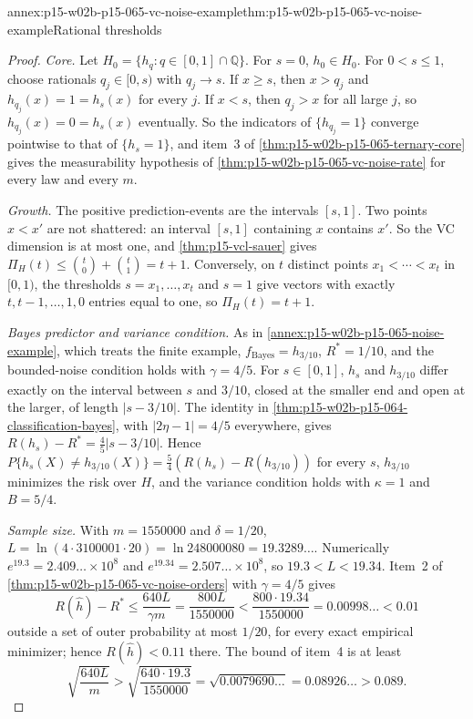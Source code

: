 \begin{annexitem}{annex:p15-w02b-p15-065-vc-noise-example}{thm:p15-w02b-p15-065-vc-noise-example}{Rational thresholds}
\begin{proof}
\emph{Core.} Let \(H_0=\{h_q:q\in[0,1]\cap\mathbb Q\}\). For \(s=0\),
\(h_0\in H_0\). For \(0<s\leq1\), choose rationals \(q_j\in[0,s)\) with
\(q_j\to s\). If \(x\geq s\), then \(x>q_j\) and \(h_{q_j}(x)=1=h_s(x)\)
for every \(j\). If \(x<s\), then \(q_j>x\) for all large \(j\), so
\(h_{q_j}(x)=0=h_s(x)\) eventually. So the indicators of
\(\{h_{q_j}=1\}\) converge pointwise to that of \(\{h_s=1\}\), and
item~3 of \cref{thm:p15-w02b-p15-065-ternary-core} gives the measurability
hypothesis of \cref{thm:p15-w02b-p15-065-vc-noise-rate} for every law and
every \(m\).

\emph{Growth.} The positive prediction-events are the intervals
\([s,1]\). Two points \(x<x'\) are not shattered: an interval \([s,1]\)
containing \(x\) contains \(x'\). So the VC dimension is at most one, and
\cref{thm:p15-vcl-sauer} gives \(\Pi_H(t)\leq\binom t0+\binom t1=t+1\).
Conversely, on \(t\) distinct points \(x_1<\cdots<x_t\) in \([0,1)\),
the thresholds \(s=x_1,\ldots,x_t\) and \(s=1\) give vectors with
exactly \(t,t-1,\ldots,1,0\) entries equal to one, so
\(\Pi_H(t)=t+1\).

\emph{Bayes predictor and variance condition.} As in
\cref{annex:p15-w02b-p15-065-noise-example}, which treats the finite
example, \(f_{\mathrm{Bayes}}=h_{3/10}\), \(R^{*}=1/10\), and the bounded-noise
condition holds with \(\gamma=4/5\). For \(s\in[0,1]\), \(h_s\) and
\(h_{3/10}\) differ exactly on the interval between \(s\) and \(3/10\),
closed at the smaller end and open at the larger, of length
\(|s-3/10|\). The identity in
\cref{thm:p15-w02b-p15-064-classification-bayes}, with
\(|2\eta-1|=4/5\) everywhere, gives \(R(h_s)-R^{*}=\tfrac45|s-3/10|\).
Hence \(P\{h_s(X)\ne h_{3/10}(X)\}=\tfrac54(R(h_s)-R(h_{3/10}))\) for every
\(s\), \(h_{3/10}\) minimizes the risk over \(H\), and the variance
condition holds with \(\kappa=1\) and \(B=5/4\).

\emph{Sample size.} With \(m=1550000\) and \(\delta=1/20\),
\(L=\ln(4\cdot3100001\cdot20)=\ln248000080=19.3289\ldots\). Numerically
\(e^{19.3}=2.409\ldots\times10^{8}\) and
\(e^{19.34}=2.507\ldots\times10^{8}\), so \(19.3<L<19.34\). Item~2 of
\cref{thm:p15-w02b-p15-065-vc-noise-orders} with \(\gamma=4/5\) gives
\[
 R(\widehat h)-R^{*}\leq\frac{640L}{\gamma m}=\frac{800L}{1550000}
 <\frac{800\cdot19.34}{1550000}=0.00998\ldots<0.01
\]
outside a set of outer probability at most \(1/20\), for every exact
empirical minimizer; hence \(R(\widehat h)<0.11\) there. The bound of
item~4 is at least
\[
 \sqrt{\frac{640L}{m}}>\sqrt{\frac{640\cdot19.3}{1550000}}
 =\sqrt{0.0079690\ldots}=0.08926\ldots>0.089 .
\]
\end{proof}
\end{annexitem}
